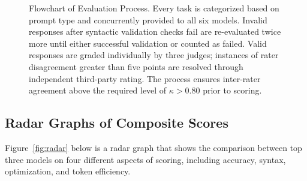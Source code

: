 \documentclass[conference]{IEEEtran}
\begin{document}
\begin{figure}[H]
\caption{Flowchart of Evaluation Process. Every task is categorized based on prompt type and concurrently provided to all six models. Invalid responses after syntactic validation checks fail are re-evaluated twice more until either successful validation or counted as failed. Valid responses are graded individually by three judges; instances of rater disagreement greater than five points are resolved through independent third-party rating. The process ensures inter-rater agreement above the required level of $\kappa > 0.80$ prior to scoring.}
\label{fig:workflow}
\end{figure}

\subsection{Radar Graphs of Composite Scores}

Figure~\ref{fig:radar} below is a radar graph that shows the comparison between top three models on four different aspects of scoring, including accuracy, syntax, optimization, and token efficiency.
\end{document}
